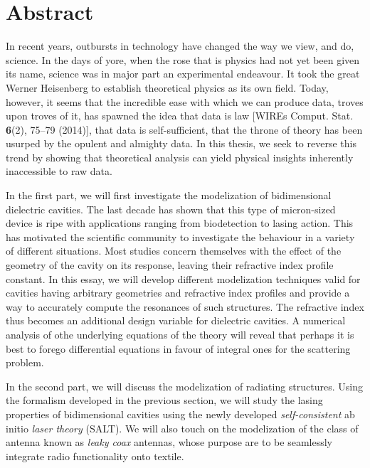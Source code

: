 \chapter*{Abstract}

In recent years, outbursts in technology have changed the way 
we view, and do, science. In the days of yore, when the rose
that is physics had not yet been given its name, science
was in major part an experimental endeavour. It took the great
Werner Heisenberg to establish theoretical physics as its own field. 
Today, however, it seems that the incredible ease with which we 
can produce data, troves upon troves of it, has spawned the idea
that data is law [WIREs Comput. Stat. \textbf{6}(2), 75--79 (2014)], that data is self-sufficient, that the throne of 
theory has been usurped by the opulent and almighty data. In this
thesis, we seek to reverse this trend by showing that theoretical 
analysis can yield physical insights inherently inaccessible to
raw data. 

In the first part, we will first investigate the modelization of bidimensional dielectric
cavities. The last decade has shown that this type of micron-sized device
is ripe with applications ranging from biodetection to lasing action. 
This has motivated the scientific community to investigate the behaviour in a
variety of different situations. Most studies concern themselves with the effect
of the geometry of the cavity on its response, leaving their refractive index
profile constant. In this essay, we will develop different modelization techniques valid 
for cavities having arbitrary geometries and refractive index profiles and provide
a way to accurately compute the resonances of such structures. The refractive
index thus becomes an additional design variable for dielectric cavities.
A numerical analysis of othe underlying equations of the theory will
reveal that perhaps it is best to forego differential equations 
in favour of integral ones for the scattering problem. 

In the second part, we will discuss the modelization of radiating structures. 
Using the formalism developed in the previous section, we will study the 
lasing properties of bidimensional cavities using the newly developed
\textit{self-consistent} ab initio \textit{laser theory} (SALT). We will also
touch on the modelization of the class of antenna known as \textit{leaky coax} antennas, 
whose purpose are to be seamlessly integrate radio functionality onto textile.
